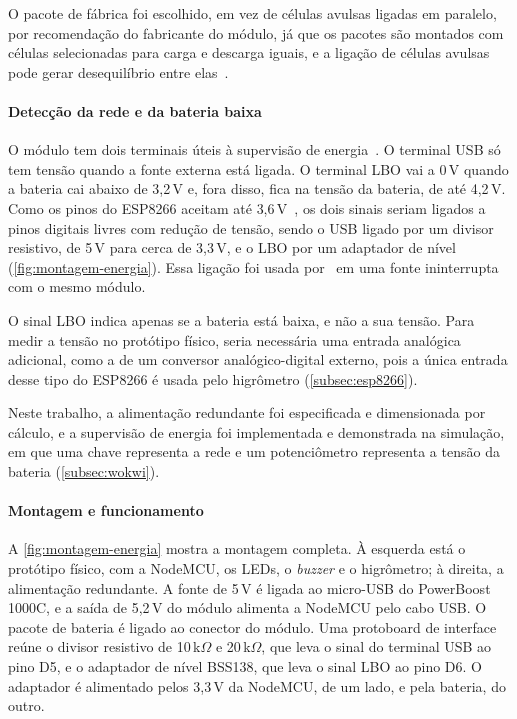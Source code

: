 O pacote de fábrica foi escolhido, em vez de células avulsas ligadas em
paralelo, por recomendação do fabricante do módulo, já que os pacotes são
montados com células selecionadas para carga e descarga iguais, e a
ligação de células avulsas pode gerar desequilíbrio entre elas~\cite{adafruit_forum_18650}.

\paragraph*{Detecção da rede e da bateria baixa}

O módulo tem dois terminais úteis à supervisão de energia~\cite{adafruit_powerboost1000c}. O terminal USB só tem tensão quando a
fonte externa está ligada. O terminal LBO vai a 0\,V quando a bateria cai
abaixo de 3,2\,V e, fora disso, fica na tensão da bateria, de até
4,2\,V.
Como os pinos do ESP8266 aceitam até 3,6\,V~\cite[Tabela~5-1]{espressif_esp8266ex}, os dois sinais seriam ligados a
pinos digitais livres com redução de tensão, sendo o USB ligado por um divisor
resistivo, de 5\,V para cerca de 3,3\,V, e o LBO por um adaptador de
nível (\autoref{fig:montagem-energia}). Essa ligação foi usada por~ em uma fonte ininterrupta com o mesmo módulo.

O sinal LBO indica apenas se a bateria está baixa, e não a sua tensão.
Para medir a tensão no protótipo físico, seria necessária uma entrada
analógica adicional, como a de um conversor analógico-digital externo,
pois a única entrada desse tipo do ESP8266 é usada pelo higrômetro
(\autoref{subsec:esp8266}).

Neste trabalho, a alimentação redundante foi especificada e dimensionada
por cálculo, e a supervisão de energia foi implementada e demonstrada na
simulação, em que uma chave representa a rede e um potenciômetro
representa a tensão da bateria (\autoref{subsec:wokwi}).

\paragraph*{Montagem e funcionamento}

A \autoref{fig:montagem-energia} mostra a montagem completa. À esquerda
está o protótipo físico, com a NodeMCU, os LEDs, o \textit{buzzer} e o
higrômetro; à direita, a alimentação redundante. A fonte de 5\,V é ligada
ao micro-USB do PowerBoost 1000C, e a saída de 5,2\,V do módulo
alimenta a NodeMCU pelo cabo USB. O pacote de bateria é ligado ao
conector do módulo.
Uma protoboard de interface reúne o divisor resistivo de 10\,k$\Omega$
e 20\,k$\Omega$, que leva o sinal do terminal USB ao pino D5, e o
adaptador de nível BSS138, que leva o sinal LBO ao pino D6. O adaptador
é alimentado pelos 3,3\,V da NodeMCU, de um lado, e pela bateria, do
outro.

